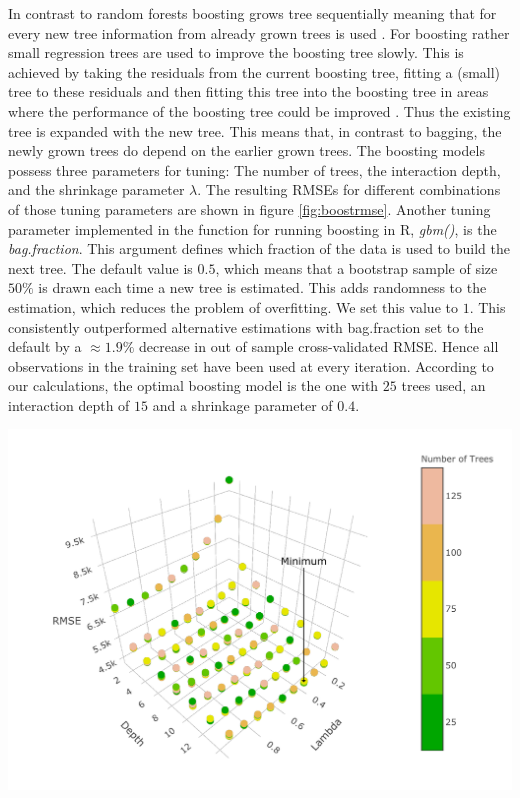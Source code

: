 \documentclass[11pt,]{article}
\let\origfigure\figure
\let\endorigfigure\endfigure
\renewenvironment{figure}[1][2] {
    \expandafter\origfigure\expandafter[H]
} {
    \endorigfigure
}
\begin{document}
In contrast to random forests boosting grows tree sequentially meaning
that for every new tree information from already grown trees is used
\autocite[cf.][p. 322]{James2014}. For boosting rather small regression
trees are used to improve the boosting tree slowly. This is achieved by
taking the residuals from the current boosting tree, fitting a (small)
tree to these residuals and then fitting this tree into the boosting
tree in areas where the performance of the boosting tree could be
improved \autocite[cf.][p. 322]{James2014}. Thus the existing tree is
expanded with the new tree. This means that, in contrast to bagging, the
newly grown trees do depend on the earlier grown trees. The boosting
models possess three parameters for tuning: The number of trees, the
interaction depth, and the shrinkage parameter \(\lambda\). The
resulting \ac{RMSE}s for different combinations of those tuning
parameters are shown in figure \ref{fig:boostrmse}. Another tuning
parameter implemented in the function for running boosting in R,
\emph{gbm()}, is the \emph{bag.fraction}. This argument defines which
fraction of the data is used to build the next tree. The default value
is \(0.5\), which means that a bootstrap sample of size \(50\%\) is
drawn each time a new tree is estimated. This adds randomness to the
estimation, which reduces the problem of overfitting. We set this value
to \(1\). This consistently outperformed alternative estimations with
bag.fraction set to the default by a \(\approx1.9\%\) decrease in out of
sample cross-validated \ac{RMSE}. Hence all observations in the training
set have been used at every iteration. According to our calculations,
the optimal boosting model is the one with \(25\) trees used, an
interaction depth of \(15\) and a shrinkage parameter of \(0.4\).

\begin{figure}

{\centering \includegraphics{../00_data/output_paper/11_boosting_plot} 

}

\caption[RMSEs of the Boosting Model for Different Parameters]{\label{fig:boostrmse}Boosting: Dependency between RMSE, Lambda, the Depths and the Number of Trees that are Grown.}\label{fig:boosting_hyper}
\end{figure}
\end{document}
